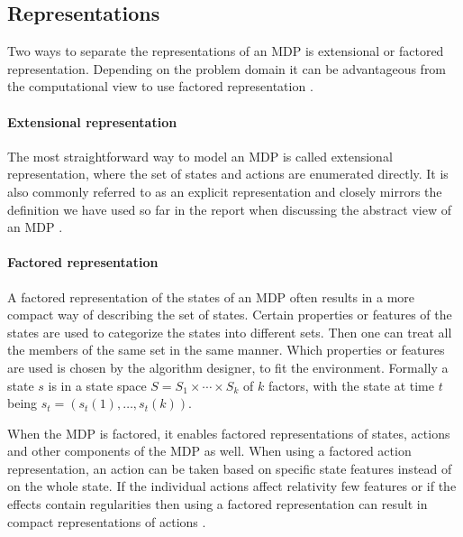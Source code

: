 \subsection{Representations}

Two ways to separate the representations of an MDP is extensional or factored
representation. Depending on the problem domain it can be advantageous from the
computational view to use factored representation
\parencite{dean1999descision}.

\paragraph{Extensional representation}

The most straightforward way to model an MDP is called extensional
representation, where the set of states and actions are enumerated directly. It
is also commonly referred to as an explicit representation and closely mirrors
the definition we have used so far in the report when discussing the abstract
view of an MDP \parencite{dean1999descision}.

\paragraph{Factored representation} 

A factored representation of the states of an MDP often results in a more
compact way of describing the set of states.  Certain properties or features of
the states are used to categorize the states into different sets. Then one can
treat all the members of the same set in the same manner. Which properties or
features are used is chosen by the algorithm designer, to fit the environment.
Formally a state $s$ is in a state space $S = S_1 \times \cdots \times S_k$
of $k$ factors, with the state at time $t$ being $s_t = (s_t(1), \ldots,
s_t(k))$.


When the MDP is factored, it enables factored representations of states,
actions and other components of the MDP as well. When using a factored action
representation, an action can be taken based on specific state features instead
of on the whole state. If the individual actions affect relativity few features
or if the effects contain regularities then using a factored representation can
result in compact representations of actions \parencite{dean1999descision}. 
